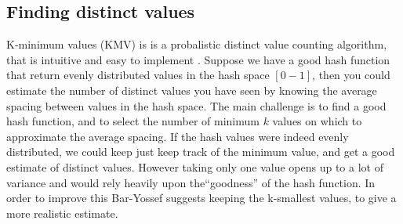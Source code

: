 

\subsection{Finding distinct values}\label{algo-distinct}
K-minimum values (KMV) is is a probalistic distinct value counting algorithm, that is intuitive and easy to implement \cite{kmv}. Suppose we have a good hash function that return evenly distributed values in the hash space $[0-1]$, then you could estimate the number of distinct values you have seen by knowing the average spacing between values in the hash space. The main challenge is to find a good hash function, and to select the number of minimum $k$ values on which to approximate the average spacing. If the hash values were indeed evenly distributed, we could keep just keep track of the minimum value, and get a good estimate of distinct values. However taking only one value opens up to a lot of variance and would rely heavily upon the``goodness'' of the hash function. In order to improve this Bar-Yossef\cite{Bar-Yossef} suggests keeping the k-smallest values, to give a more realistic estimate.

